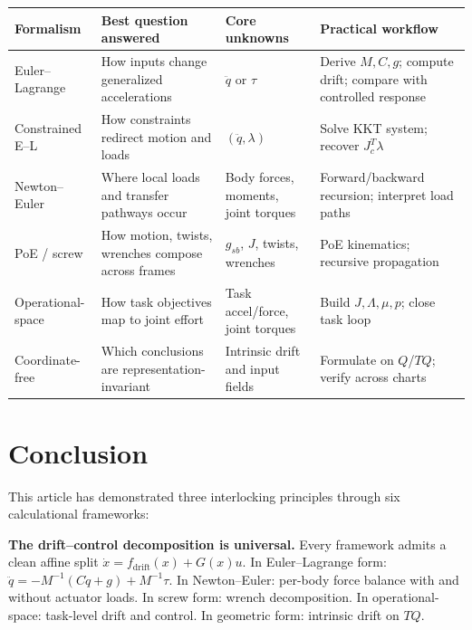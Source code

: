 \documentclass[11pt]{article}
\begin{document}
\begin{center}
\small
\renewcommand{\arraystretch}{1.2}
\begin{tabularx}{\textwidth}{>{\raggedright\arraybackslash}p{3.1cm}Y Y Y}
\toprule
Formalism & Best question answered & Core unknowns & Practical workflow \\
\midrule
Euler--Lagrange & How inputs change generalized accelerations & $\ddot{q}$ or $\tau$ & Derive $M,C,g$; compute drift; compare with controlled response \\
\midrule
Constrained E--L & How constraints redirect motion and loads & $(\ddot{q},\lambda)$ & Solve KKT system; recover $J_c^T\lambda$ \\
\midrule
Newton--Euler & Where local loads and transfer pathways occur & Body forces, moments, joint torques & Forward/backward recursion; interpret load paths \\
\midrule
PoE / screw & How motion, twists, wrenches compose across frames & $g_{sb}$, $J$, twists, wrenches & PoE kinematics; recursive propagation \\
\midrule
Operational-space & How task objectives map to joint effort & Task accel/force, joint torques & Build $J,\Lambda,\mu,p$; close task loop \\
\midrule
Coordinate-free & Which conclusions are representation-invariant & Intrinsic drift and input fields & Formulate on $Q$/$TQ$; verify across charts \\
\bottomrule
\end{tabularx}
\end{center}


\section{Conclusion}\label{sec:conclusion}

This article has demonstrated three interlocking principles through six calculational frameworks:

\textbf{The drift--control decomposition is universal.}
Every framework admits a clean affine split $\dot{x}=f_{\mathrm{drift}}(x)+G(x)u$.
In Euler--Lagrange form: $\ddot{q}=-M^{-1}(C\dot{q}+g)+M^{-1}\tau$.
In Newton--Euler: per-body force balance with and without actuator loads.
In screw form: wrench decomposition.
In operational-space: task-level drift and control.
In geometric form: intrinsic drift on $TQ$.
\end{document}
